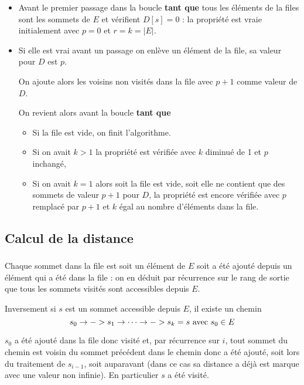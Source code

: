 \begin{itemize}
  \item Avant le premier passage dans la boucle {\bf tant que} tous les éléments de la files sont les sommets de $E$ et vérifient $D[s]=0$ : la propriété est vraie initialement avec $p=0$ et $r=k=|E|$.

  \item Si elle est vrai avant un passage on enlève un élément de la file, sa valeur pour $D$ est $p$. 
  
  On ajoute alors les voisins non visités dans la file avec $p+1$ comme valeur de $D$.

On revient alors avant la boucle {\bf tant que} 
\begin{itemize}
    \item Si la file est vide, on finit l'algorithme.
\item Si on avait $k>1$ la propriété est vérifiée avec $k$ diminué de 1 et $p$ inchangé, 
\item Si on avait $k=1$ alors soit la file est vide, soit elle ne contient que des sommets de valeur $p+1$ pour $D$, la propriété est encore vérifiée avec $p$ remplacé par $p+1$ et $k$ égal au nombre d'éléments dans la file.
\end{itemize}
\end{itemize}
\subsection{Calcul de la distance}
\subsubsection{}
Chaque sommet dans la file est soit un élément de $E$ soit a été ajouté depuis un élément qui a été dans la file : on en déduit par récurrence sur le rang de sortie que tous les sommets visités sont accessibles depuis $E$.

Inversement si $s$ est un sommet accessible depuis $E$, il existe un chemin 
\[s_0 \rightarrow -> s_1 \rightarrow \cdots \rightarrow -> s_k = s\hbox{ avec }s_0\in E\]

$s_0$ a été ajouté dans la file donc visité et, par récurrence sur $i$, tout sommet du chemin est voisin du sommet précédent dans le chemin donc a été ajouté, soit lors du traitement de $s_{i-1}$, soit auparavant (dans ce cas sa distance a déjà est marque avec une valeur non infinie). En particulier $s$ a été visité.


